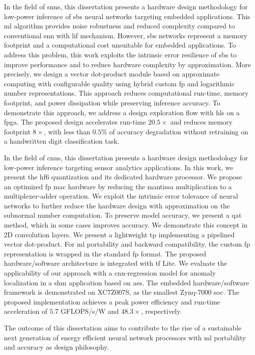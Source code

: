 In the field of \glspl{snn}, this dissertation presents a hardware design methodology for low-power inference of \gls{sbs} neural networks targeting embedded applications. This \gls{ml} algorithm provides noise robustness and reduced complexity compared to conventional \gls{snn} with \gls{lif} mechanism. However, \gls{sbs} networks represent a memory footprint and a computational cost unsuitable for embedded applications. To address this problem, this work exploits the intrinsic error resilience of \gls{sbs} to improve performance and to reduce hardware complexity by approximation. More precisely, we design a vector dot-product module based on approximate computing with configurable quality using hybrid custom \gls{fp} and logarithmic number representations. This approach reduces computational run-time, memory footprint, and power dissipation while preserving inference accuracy. To demonstrate this approach, we address a design exploration flow with \gls{hls} on a \gls{fpga}. The proposed design accelerates run-time $20.5\times$ and reduces memory footprint $8\times$, with less than $0.5\%$ of accuracy degradation without retraining on a handwritten digit classification task.

In the field of \glspl{cnn}, this dissertation presents a hardware design methodology for low-power inference targeting sensor analytics applications. In this work, we present the \gls{hf6} quantization and its dedicated hardware processor. We propose an optimized \gls{fp} \gls{mac} hardware by reducing the mantissa multiplication to a multiplexer-adder operation. We exploit the intrinsic error tolerance of neural networks to further reduce the hardware design with approximation on the subnormal number computation. To preserve model accuracy, we present a \gls{qat} method, which in some cases improves accuracy. We demonstrate this concept in 2D convolution layers. We present a lightweight \gls{tp} implementing a pipelined vector dot-product. For \gls{ml} portability and backward compatibility, the custom \gls{fp} representation is wrapped in the standard \gls{fp} format. The proposed hardware/software architecture is integrated with \gls{tf} Lite. We evaluate the applicability of our approach with a \gls{cnn}-regression model for anomaly localization in a \gls{shm} application based on \glspl{ae}. The embedded hardware/software framework is demonstrated on XC7Z007S, as the smallest Zynq-7000 \gls{soc}. The proposed implementation achieves a peak power efficiency and run-time acceleration of $5.7$ GFLOPS/s/W and $48.3\times$, respectively.

The outcome of this dissertation aims to contribute to the rise of a sustainable next generation of energy efficient neural network processors with \gls{ml} portability and accuracy as design philosophy.